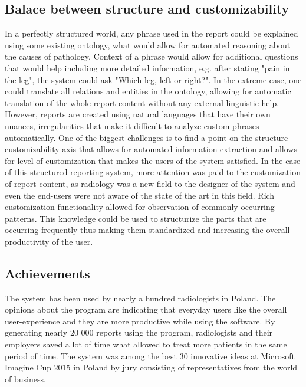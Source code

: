 \documentclass[12pt, twoside, openany]{report}
\theoremstyle{definition}
\begin{document}
\subsection{Balace between structure and customizability}
In a perfectly structured world, any phrase used in the report could be explained using some existing ontology, what would allow for automated reasoning about the causes of pathology. Context of a phrase would allow for additional questions that would help including more detailed information, e.g. after stating "pain in the leg", the system could ask "Which leg, left or right?". In the extreme case, one could translate all relations and entities in the ontology, allowing for automatic translation of the whole report content without any external linguistic help. However, reports are created using natural languages that have their own nuances, irregularities that make it difficult to analyze custom phrases automatically. One of the biggest challenges is to find a point on the structure--customizability axis that allows for automated information extraction and allows for level of customization that makes the users of the system satisfied. In the case of this structured reporting system, more attention was paid to the customization of report content, as radiology was a new field to the designer of the system and even the end-users were not aware of the state of the art in this field. Rich customization functionality allowed for observation of commonly occurring patterns. This knowledge could be used to structurize the parts that are occurring frequently thus making them standardized and increasing the overall productivity of the user.


\subsection{Achievements}
The system has been used by nearly a hundred radiologists in Poland. The opinions about the program are indicating that everyday users like the overall user-experience and they are more productive while using the software. 
By generating nearly 20 000 reports using the program, radiologists and their employers saved a lot of time what allowed to treat more patients in the same period of time.
The system was among the best 30 innovative ideas at Microsoft Imagine Cup 2015 in Poland by jury consisting of representatives from the world of business. 
\end{document}

